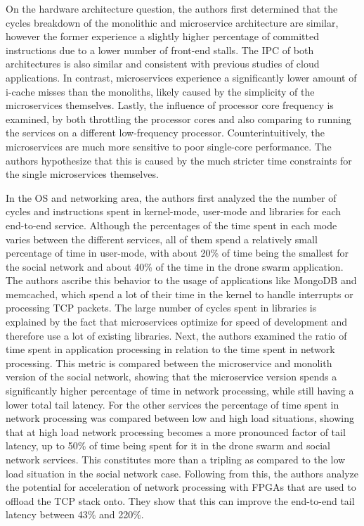 \documentclass[10pt]{article}
\begin{document}
	On the hardware architecture question, the authors first determined that the cycles breakdown of the monolithic and microservice architecture are similar, however the former experience a slightly higher percentage of committed instructions due to a lower number of front-end stalls. The IPC of both architectures is also similar and consistent with previous studies of cloud applications. In contrast, microservices experience a significantly lower amount of i-cache misses than the monoliths, likely caused by the simplicity of the microservices themselves. Lastly, the influence of processor core frequency is examined, by both throttling the processor cores and also comparing to running the services on a different low-frequency processor. Counterintuitively, the microservices are much more sensitive to poor single-core performance. The authors hypothesize that this is caused by the much stricter time constraints for the single microservices themselves.
	
	In the OS and networking area, the authors first analyzed the the number of cycles and instructions spent in kernel-mode, user-mode and libraries for each end-to-end service. Although the percentages of the time spent in each mode varies between the different services, all of them spend a relatively small percentage of time in user-mode, with about 20\% of time being the smallest for the social network and about 40\% of the time in the drone swarm application. The authors ascribe this behavior to the usage of applications like MongoDB and memcached, which spend a lot of their time in the kernel to handle interrupts or processing TCP packets. The large number of cycles spent in libraries is explained by the fact that microservices optimize for speed of development and therefore use a lot of existing libraries. Next, the authors examined the ratio of time spent in application processing in relation to the time spent in network processing. This metric is compared between the microservice and monolith version of the social network, showing that the microservice version spends a significantly higher percentage of time in network processing, while still having a lower total tail latency. For the other services the percentage of time spent in network processing was compared between low and high load situations, showing that at high load network processing becomes a more pronounced factor of tail latency, up to 50\% of time being spent for it in the drone swarm and social network services. This constitutes more than a tripling as compared to the low load situation in the social network case. Following from this, the authors analyze the potential for acceleration of network processing with FPGAs that are used to offload the TCP stack onto. They show that this can improve the end-to-end tail latency between 43\% and 220\%.
	
\end{document}
